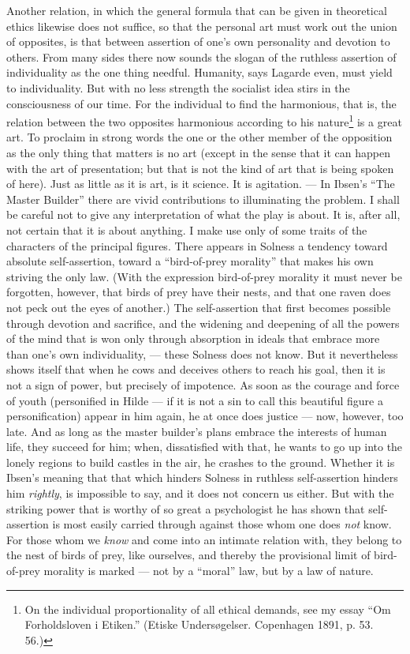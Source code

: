 \documentclass[12pt,a4paper,openany]{book}
\newcommand{\opage}[1]{\marginnote{\footnotesize\textit{[#1]}}}
\begin{document}
Another relation, in which the general formula that
can be given in theoretical ethics likewise does not suffice, so that
the personal art must work out the union of opposites,
is that between assertion of one's own personality
and devotion to others. From many sides there now sounds
the slogan of the ruthless assertion of individuality as
the one thing needful. Humanity, says Lagarde even, must yield
to individuality. But with no less strength the socialist idea
stirs in the consciousness of our time. For the
individual to find the harmonious, that is, the relation between the two opposites harmonious according to his
\opage{192}nature\footnote{On the individual proportionality of all ethical demands,
see my essay ``Om Forholdsloven i Etiken.'' (Etiske
Undersøgelser. Copenhagen 1891, p. 53. 56.)} is a great art. To proclaim in strong words the one or
the other member of the opposition as the only thing that
matters is no art (except in the sense that it can
happen with the art of presentation; but that is not the kind of
art that is being spoken of here). Just as little as it is art,
is it science. It is agitation. --- In Ibsen's ``The Master Builder''
there are vivid contributions to illuminating the problem.
I shall be careful not to give any interpretation of
what the play is about. It is, after all, not certain that it
is about anything. I make use only of some traits of the
characters of the principal figures. There appears in Solness a
tendency toward absolute self-assertion, toward a ``bird-of-prey morality'' that
makes his own striving the only law. (With the expression
bird-of-prey morality it must never be forgotten, however, that birds of prey have
their nests, and that one raven does not peck out the eyes
of another.) The self-assertion that first becomes possible
through devotion and sacrifice, and the widening and
deepening of all the powers of the mind that is won only through
absorption in ideals that embrace more than one's own
individuality, --- these Solness does not know. But it nevertheless shows itself that
when he cows and deceives others to reach his goal, then
it is not a sign of power, but precisely of impotence. As
soon as the courage and force of youth (personified
in Hilde --- if it is not a sin to call this beautiful
figure a personification) appear in him again,
he at once does justice --- now, however, too late. And as
long as the master builder's plans embrace the interests of human life,
they succeed for him; when, dissatisfied with that, he wants
to go up into the lonely regions to build castles in the air, he
crashes to the ground. Whether it is Ibsen's meaning that that which hinders
Solness in ruthless self-assertion hinders him \emph{rightly},
is impossible to say, and it does not concern us either.
But with the striking power that is worthy of so great a psychologist
\opage{193}he has shown that self-assertion is most easily carried through
against those whom one does \emph{not} know. For those whom we \emph{know} and come
into an intimate relation with, they belong to the nest of birds of prey, like
ourselves, and thereby the provisional limit of bird-of-prey morality is marked
--- not by a ``moral'' law, but by a law of nature.
\end{document}
